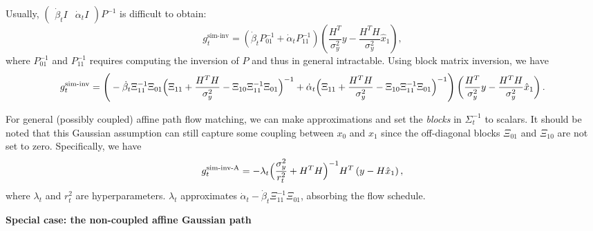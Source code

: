 Usually, $\begin{pmatrix}\dot\beta_t I & \dot\alpha_t I\end{pmatrix}P^{-1}$ is difficult to obtain:
\begin{equation}
    g_t^{\text{sim-inv}} = (\dot\beta_t P^{-1}_{01} + \dot\alpha_t P^{-1}_{11})\left(\frac{H^T}{\sigma_y^2}y - \frac{H^TH}{\sigma_y^2} \hat{x}_1\right), 
\end{equation}
where $P_{01}^{-1}$ and $P_{11}^{-1}$ requires computing the inversion of $P$ and thus in general intractable. 
Using block matrix inversion, we have
\begin{align}
    g_t^{\text{sim-inv}} = \Bigg{(}-\dot\beta_t \Xi_{11}^{-1}\Xi_{01} \Big{(}\Xi_{11} + \frac{H^TH}{\sigma_y^2}-\Xi_{10}\Xi_{11}^{-1}\Xi_{01}\Big{)}^{-1}
    +\dot\alpha_t \Big{(}\Xi_{11} + \frac{H^TH}{\sigma_y^2}-\Xi_{10}\Xi_{11}^{-1}\Xi_{01}\Big{)}^{-1}\Bigg{)}
    \left(\frac{H^T}{\sigma_y^2}y - \frac{H^TH}{\sigma_y^2} \hat{x}_1\right).
\end{align}

For general (possibly coupled) affine path flow matching, we can make approximations and set the \emph{blocks} in $\Sigma_t^{-1}$ to scalars. It should be noted that this Gaussian assumption can still capture some coupling between $x_0$ and $x_1$ since the off-diagonal blocks $\Xi_{01}$ and $\Xi_{10}$ are not set to zero.
Specifically, we have
\begin{equation}
    g_t^{\text{sim-inv-A}} = -\lambda_t \Big{(}\frac{\sigma_y^2}{r_t^2} + H^TH\Big{)}^{-1}
    H^T\left(y - {H} \hat{x}_1\right),
\end{equation}
where $\lambda_t$ and $r_t^2$ are hyperparameters. $\lambda_t$ approximates $\dot\alpha_t-\dot\beta_t \Xi_{11}^{-1}\Xi_{01}$, absorbing the flow schedule.

\textbf{Special case: the non-coupled affine Gaussian path}


